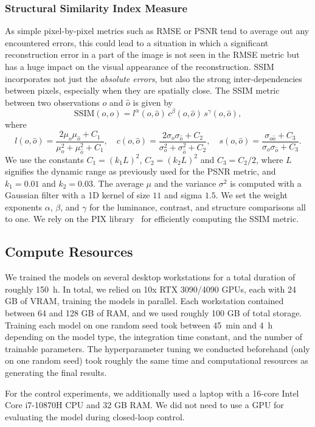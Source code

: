 \subsubsection{Structural Similarity Index Measure}
As simple pixel-by-pixel metrics such as \gls{RMSE} or \gls{PSNR} tend to average out any encountered errors, this could lead to a situation in which a significant reconstruction error in a part of the image is not seen in the \gls{RMSE} metric but has a huge impact on the visual appearance of the reconstruction. \gls{SSIM}~\citep{wang2004image} incorporates not just the \emph{absolute errors}, but also the strong inter-dependencies between pixels, especially when they are spatially close.
The \gls{SSIM} metric between two observations $o$ and $\hat{o}$ is given by
\begin{equation}
    \mathrm{SSIM}(o, \hat{o}) = l^\alpha(o, \hat{o}) \, c^\beta(o, \hat{o}) \, s^\gamma(o, \hat{o}),
\end{equation}
where
\begin{equation}
    l(o, \hat{o}) = \frac{2 \mu_o \mu_{\hat{o}} + C_1}{\mu_o^2 + \mu_{\hat{o}}^2 + C_1},
    \quad
    c(o, \hat{o}) = \frac{2 \sigma_o \sigma_{\hat{o}} + C_2}{\sigma_o^2 + \sigma_{\hat{o}}^2 + C_2},
    \quad 
    s(o, \hat{o}) = \frac{\sigma_{o\hat{o}} + C_3}{\sigma_o \sigma_{\hat{o}} + C_3}.
\end{equation}
We use the constants $C_1 = (k_1 L)^2$, $C_2 = (k_2 L)^2$ and $C_3 = C_2 / 2$, where $L$ signifies the dynamic range as previously used for the \gls{PSNR} metric,
and $k_1 = 0.01$ and $k_2 = 0.03$. The average $\mu$ and the variance $\sigma^2$ is computed with a Gaussian filter with a 1D kernel of size $11$ and sigma $1.5$.
We set the weight exponents $\alpha$, $\beta$, and $\gamma$ for the luminance, contrast, and structure comparisons all to one.
We rely on the PIX library~\citep{deepmind2020jax} for efficiently computing the \gls{SSIM} metric.

\subsection{Compute Resources}\label{apx:sub:compute_resource}

We trained the models on several desktop workstations for a total duration of roughly \SI{150}{h}.
In total, we relied on 10x RTX 3090/4090 GPUs, each with 24 GB of VRAM, training the models in parallel.
Each workstation contained between 64 and 128 GB of RAM, and we used roughly 100 GB of total storage. 
Training each model on one random seed took between \SI{45}{min} and \SI{4}{h} depending on the model type, the integration time constant, and the number of trainable parameters.
The hyperparameter tuning we conducted beforehand (only on one random seed) took roughly the same time and computational resources as generating the final results.

For the control experiments, we additionally used a laptop with a 16-core Intel Core i7-10870H CPU and 32 GB RAM. We did not need to use a GPU for evaluating the model during closed-loop control.